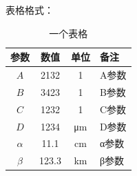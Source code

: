 表格格式：
\begin{table}[H]
    \centering
    \caption{一个表格}
    \label{tab:all_parameters}
    \begin{tabular}{c c c l}
    \toprule[1.5pt]
    参数          & 数值         & 单位   & 备注     \\ 
    \midrule[0.5pt]
    $A$         & 2132   & 1      & A参数 \\
    $B$         & 3423   & 1      & B参数 \\ 
    $C$         & 1232   & 1      & C参数 \\ 
    $D$         & 1234   & μm     & D参数 \\
    $\alpha$    & 11.1   & cm     & α参数 \\
    $\beta$     & 123.3  & km     & β参数 \\       
    \bottomrule[1.5pt]
    \end{tabular}
\end{table}

\clearpage